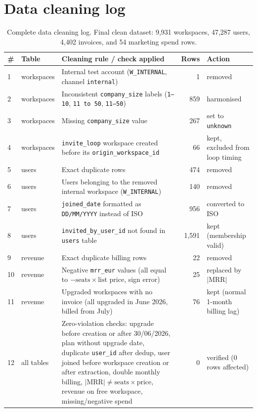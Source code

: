 \documentclass{rapportIMT}
\renewcommand{\arraystretch}{1.25}
\begin{document}
\newpage
\appendix
\section{Data cleaning log}
\label{sec:app-log}

\begin{table}[htbp]
\centering\footnotesize\renewcommand{\arraystretch}{1.15}
\begin{tabularx}{\linewidth}{@{}llXrl@{}}
\toprule
\# & Table & Cleaning rule / check applied & Rows & Action \\
\midrule
1  & workspaces & Internal test account (\texttt{W\_INTERNAL}, channel \texttt{internal}) & 1 & removed \\
2  & workspaces & Inconsistent \texttt{company\_size} labels (\texttt{1–10}, \texttt{11 to 50}, \texttt{11–50}) & 859 & harmonised \\
3  & workspaces & Missing \texttt{company\_size} value & 267 & set to \texttt{unknown} \\
4  & workspaces & \texttt{invite\_loop} workspace created before its \texttt{origin\_workspace\_id} & 66 & kept, excluded from loop timing \\
5  & users & Exact duplicate rows & 474 & removed \\
6  & users & Users belonging to the removed internal workspace (\texttt{W\_INTERNAL}) & 140 & removed \\
7  & users & \texttt{joined\_date} formatted as \texttt{DD/MM/YYYY} instead of ISO & 956 & converted to ISO \\
8  & users & \texttt{invited\_by\_user\_id} not found in \texttt{users} table & 1,591 & kept (membership valid) \\
9  & revenue & Exact duplicate billing rows & 22 & removed \\
10 & revenue & Negative \texttt{mrr\_eur} values (all equal to $-\text{seats} \times \text{list price}$, sign error) & 25 & replaced by $|\text{MRR}|$ \\
11 & revenue & Upgraded workspaces with no invoice (all upgraded in June 2026, billed from July) & 76 & kept (normal 1-month billing lag) \\
12 & all tables & Zero-violation checks: upgrade before creation or after 30/06/2026, plan without upgrade date, duplicate \texttt{user\_id} after dedup, user joined before workspace creation or after extraction, double monthly billing, $|\text{MRR}| \neq \text{seats} \times \text{price}$, revenue on free workspace, missing/negative spend & 0 & verified (0 rows affected) \\
\bottomrule
\end{tabularx}
\caption{Complete data cleaning log. Final clean dataset: 9,931 workspaces, 47,287 users, 4,402 invoices, and 54 marketing spend rows.}
\label{tab:log}
\end{table}
\end{document}

